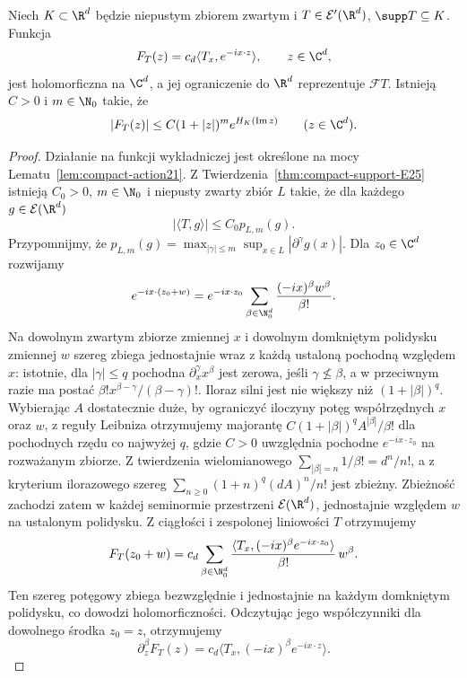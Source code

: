\begin{twierdzenie}
\label{thm:dt-pws-forward}
Niech $K\subset\R^d$ będzie niepustym zbiorem zwartym
i $T\in\mathcal E'(\R^d)$, $\supp T\subseteq K$.
Funkcja
\[
 F_T(z)=c_d\langle T_x,e^{-ix\cdot z}\rangle,
 \qquad z\in\C^d,
\]
jest holomorficzna na $\C^d$, a jej ograniczenie
do $\R^d$ reprezentuje $\mathcal FT$.
Istnieją $C>0$ i $m\in\N_0$ takie, że
\[
 |F_T(z)|\le C(1+|z|)^m e^{H_K(\operatorname{Im}z)}
 \qquad(z\in\C^d).
\]
\end{twierdzenie}
\begin{proof}
Działanie na funkcji wykładniczej jest określone na
mocy Lematu~\ref{lem:compact-action21}.
Z Twierdzenia~\ref{thm:compact-support-E25} istnieją
$C_0>0$, $m\in\N_0$ i niepusty zwarty zbiór $L$
takie, że dla każdego $g\in\mathcal E(\R^d)$
\[
 |\langle T,g\rangle|\le C_0p_{L,m}(g).
\]
Przypomnijmy, że $p_{L,m}(g)=
\max_{|\gamma|\le m}\sup_{x\in L}|\partial^\gamma g(x)|$.
Dla $z_0\in\C^d$ rozwijamy
\[
 e^{-ix\cdot(z_0+w)}
 =e^{-ix\cdot z_0}
 \sum_{\beta\in\N_0^d}\frac{(-ix)^\beta w^\beta}{\beta!}.
\]
Na dowolnym zwartym zbiorze zmiennej $x$ i dowolnym
domkniętym polidysku zmiennej $w$ szereg zbiega
jednostajnie wraz z każdą ustaloną pochodną względem $x$:
istotnie, dla $|\gamma|\le q$ pochodna
$\partial_x^\gamma x^\beta$ jest zerowa, jeśli
$\gamma\not\le\beta$, a w przeciwnym razie ma postać
$\beta!x^{\beta-\gamma}/(\beta-\gamma)!$.
Iloraz silni jest nie większy niż $(1+|\beta|)^q$.
Wybierając $A$ dostatecznie duże, by ograniczyć
iloczyny potęg współrzędnych $x$ oraz $w$, z reguły
Leibniza otrzymujemy majorantę
$C(1+|\beta|)^q A^{|\beta|}/\beta!$ dla pochodnych
rzędu co najwyżej $q$, gdzie $C>0$ uwzględnia
pochodne $e^{-ix\cdot z_0}$ na rozważanym zbiorze.
Z twierdzenia wielomianowego
$\sum_{|\beta|=n}1/\beta!=d^n/n!$, a z kryterium
ilorazowego szereg
$\sum_{n\ge0}(1+n)^q(dA)^n/n!$ jest zbieżny.
Zbieżność zachodzi zatem w każdej seminormie
przestrzeni $\mathcal E(\R^d)$, jednostajnie względem
$w$ na ustalonym polidysku. Z ciągłości i zespolonej
liniowości $T$ otrzymujemy
\[
 F_T(z_0+w)=c_d\sum_{\beta\in\N_0^d}
 \frac{\langle T_x,(-ix)^\beta e^{-ix\cdot z_0}\rangle}
 {\beta!}\,w^\beta.
\]
Ten szereg potęgowy zbiega bezwzględnie i jednostajnie
na każdym domkniętym polidysku, co dowodzi
holomorficzności. Odczytując jego współczynniki
dla dowolnego środka $z_0=z$, otrzymujemy
\[
 \partial_z^\beta F_T(z)
 =c_d\langle T_x,(-ix)^\beta e^{-ix\cdot z}\rangle.
\]


\end{proof}
